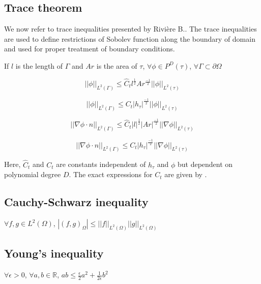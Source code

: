 \documentclass[a4paper]{book}
\begin{document}
\subsection{Trace theorem} 

We now refer to trace inequalities presented by Rivi\`ere B.\cite{riviere}. The trace inequalities are used to define restrictions of Sobolev function along the boundary of domain and used for proper treatment of boundary conditions. 

If $l$ is the length of $\Gamma$ and $Ar$ is the area of $\tau$,  $\forall \phi \in P^D (\tau)$, $\forall \Gamma \subset \partial \Omega$

\begin{equation}
||\phi||_{L^2(\Gamma)} \leq \hat{C}_t l^{\frac{1}{2}} Ar^{\frac{-1}{2}} ||\phi||_{L^2(\tau)}
\end{equation}

\begin{equation}
||\phi||_{L^2(\Gamma)} \leq {C}_t |h_\tau|^{\frac{-1}{2}} ||\phi||_{L^2(\tau)}
\end{equation}

\begin{equation}
||\nabla \phi \cdot n||_{L^2(\Gamma)} \leq \hat{C}_t |l|^{\frac{1}{2}} |Ar|^{\frac{-1}{2}} ||\nabla \phi||_{L^2(\tau)}
\end{equation}

\begin{equation}
||\nabla \phi \cdot n||_{L^2(\Gamma)} \leq {C}_t |h_\tau|^{\frac{-1}{2}} ||\nabla \phi||_{L^2(\tau)}
\end{equation}

Here, $\hat{C}_t$ and ${C}_t$ are constants independent of $h_\tau$ and $\phi$ but dependent on polynomial degree $D$. The exact expressions for $C_t$ are given by \cite{warburton}.

\subsection{Cauchy-Schwarz inequality} 
\begin{center}
$\forall f,g \in L^2(\Omega)$, $|(f,g)_{\Omega}| \leq ||f||_{L^2(\Omega)} ||g||_{L^2(\Omega)}$ \\
\end{center}

\subsection{Young's inequality} 
\begin{center}
$\forall \epsilon > 0$, $\forall a,b \in \mathbb{R}$, $ab \leq \frac{\epsilon}{2}a^2 + \frac{1}{2 \epsilon}b^2$\\
\end{center}
\end{document}
